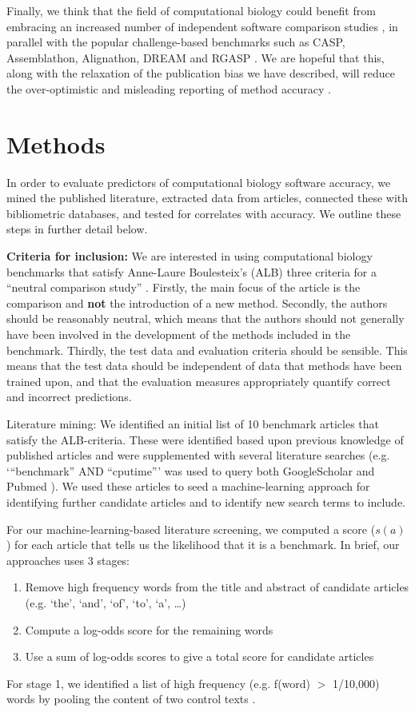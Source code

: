 \documentclass[fleqn,10pt]{SelfArx} %
\begin{document}
Finally, we think that the field of computational biology could benefit from embracing an increased number of independent software comparison studies \cite{Boulesteix2013-vb}, in parallel with the popular challenge-based benchmarks such as CASP, Assemblathon, Alignathon, DREAM and RGASP \cite{Boutros2014-zm}. We are hopeful that this, along with the relaxation of the publication bias we have described, will reduce the over-optimistic and misleading reporting of method accuracy \cite{Boulesteix2010-te,Jelizarow2010-zf,Norel2011-cq}. 

\section*{Methods}
In order to evaluate predictors of computational biology software accuracy, we mined the published literature, extracted data from articles, connected these with bibliometric databases, and tested for correlates with accuracy. We outline these steps in further detail below. 

\textbf{Criteria for inclusion:} We are interested in using computational biology benchmarks that satisfy Anne-Laure Boulesteix’s (ALB) three criteria for a “neutral comparison study” \cite{Boulesteix2013-vb}. Firstly, the main focus of the article is the comparison and \textbf{not} the introduction of a new method. Secondly, the authors should be reasonably neutral, which means that the authors should not generally have been involved in the development of the methods included in the benchmark. Thirdly, the test data and evaluation criteria should be sensible. This means that the test data should be independent of data that methods have been trained upon, and that the evaluation measures appropriately quantify correct and incorrect predictions.

Literature mining: We identified an initial list of 10 benchmark articles that satisfy the ALB-criteria. These were identified based upon previous knowledge of published articles and were supplemented with several literature searches (e.g. ‘“benchmark” AND “cputime”’ was used to query both GoogleScholar and Pubmed \cite{Sayers2010-vm,McEntyre2001-fl}). We used these articles to seed a machine-learning approach for identifying further candidate articles and to identify new search terms to include.

For our machine-learning-based literature screening, we computed a score ($s(a)$) for each article that tells us the likelihood that it is a benchmark. In brief, our approaches uses 3 stages:
\begin{enumerate}
\item Remove high frequency words from the title and abstract of candidate articles (e.g. ‘the’, ‘and’, ‘of’, ‘to’, ‘a’, …) 
\item Compute a log-odds score for the remaining words 
\item Use a sum of log-odds scores to give a total score for candidate articles
\end{enumerate}
For stage 1, we identified a list of high frequency (e.g. f(word) $>$ 1/10,000) words by pooling the content of two control texts \cite{Carroll1865-hk,Tolkien1937-ke}. 
\end{document}

